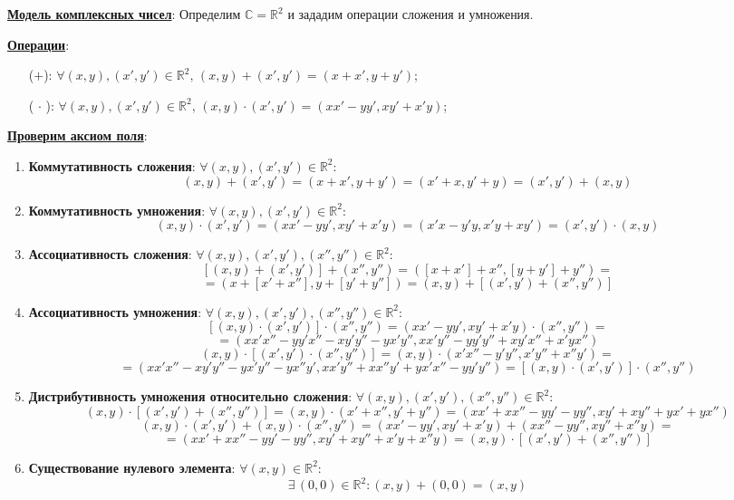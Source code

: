 \documentclass[12pt]{article}
\newcommand{\MR}{\mathbb{R}}
\newcommand{\MC}{\mathbb{C}}
\theoremstyle{definition}
\begin{document}
\textbf{\uline{Модель комплексных чисел}}: Определим $\MC = \MR^2$ и зададим операции сложения и умножения.

\textbf{\uline{Операции}}:
\begin{enumerate}
	\item[($+$):] $\forall (x,y), (x',y') \in \MR^2, \, (x,y) + (x',y') = (x + x', y + y')$;
	\item[($\, \cdot\, $):] $\forall (x,y), (x',y') \in \MR^2, \, (x,y){\cdot}(x',y') = (xx' - yy', xy' + x'y)$;
\end{enumerate}

\textbf{\uline{Проверим аксиом поля}}:
\begin{enumerate}[label=\arabic*)]
	\item \textbf{Коммутативность сложения}: $\forall (x,y), (x',y') \in \MR^2$:
	$$
		(x,y) + (x',y') = (x + x', y + y') = (x' + x, y' + y) =  (x',y') + (x,y)
	$$
	\item \textbf{Коммутативность умножения}: $\forall (x,y), (x',y') \in \MR^2$:
	$$
		(x,y){\cdot}(x',y') = (xx' - yy', xy' + x'y) = (x'x - y'y, x'y + xy') = (x',y'){\cdot}(x,y)
	$$
	\item \textbf{Ассоциативность сложения}: $\forall (x,y), (x',y'), (x'',y'') \in \MR^2$:
	$$
		\left[(x,y) + (x',y')\right] + (x'',y'') = ([x + x'] + x'', [y + y'] + y'') = 
	$$
	$$
		= (x + [x' + x''], y + [y' + y'']) = (x,y) + [(x',y') + (x'',y'')]
	$$
	\item \textbf{Ассоциативность умножения}: $\forall (x,y), (x',y'), (x'',y'') \in \MR^2$:
	$$
		 [(x,y){\cdot}(x',y')]{\cdot}(x'',y'') = (xx' - yy', xy' + x'y){\cdot}(x'',y'') =
	$$
	$$
		= (xx'x'' - yy'x'' - xy'y'' - yx'y'', xx'y'' - yy'y'' + xy'x'' + x'yx'') 
	$$
	$$
		(x,y){\cdot}[(x',y'){\cdot}(x'',y'')] = (x,y){\cdot}(x'x'' - y'y'', x'y'' + x''y') =
	$$
	$$
		= (xx'x'' - xy'y'' - yx'y'' -yx''y', xx'y'' + xx''y' + yx'x'' -yy'y'') =  [(x,y){\cdot}(x',y')]{\cdot}(x'',y'')
	$$
	\item \textbf{Дистрибутивность умножения относительно сложения}: $\forall (x,y), (x',y'), (x'',y'') \in \MR^2$:
	$$
		(x,y){\cdot}[(x',y') + (x'',y'')] = (x,y){\cdot}(x' + x'', y' + y'') = (xx' + xx'' - yy' -yy'', xy' + xy'' + yx' + yx'')
	$$
	$$
		(x,y){\cdot}(x',y') + (x,y){\cdot}(x'',y'') = (xx' - yy', xy' + x'y) + (xx'' - yy'', xy'' + x''y) = 
	$$
	$$
		= (xx' + xx'' -yy' - yy'', xy' + xy'' + x'y + x''y) = (x,y){\cdot}[(x',y') + (x'',y'')]
	$$
	\item \textbf{Существование нулевого элемента}: $\forall (x,y) \in \MR^2$:
	$$
		\exists\, (0,0) \in \MR^2 \colon  (x,y) + (0,0) = (x,y)
$$
\end{enumerate}
\end{document}
